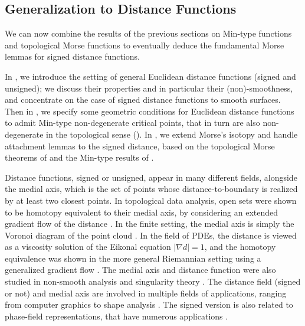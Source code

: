 \documentclass[11pt]{article}
\newcommand{\grad}{\nabla}
\theoremstyle{plain}
\theoremstyle{definition}
\theoremstyle{remark}
\begin{document}
\subsection{Generalization to Distance Functions}
\label{sec:generalization_dist_functions}

We can now combine the results of the previous sections on Min-type functions and topological Morse functions to eventually deduce the fundamental Morse lemmas for signed distance functions.

In , we introduce the setting of general Euclidean distance functions (signed and unsigned); we discuss their properties and in particular their (non)-smoothness, and concentrate on the case of signed distance functions to smooth surfaces.
Then in , we specify some geometric conditions for Euclidean distance functions to admit Min-type non-degenerate critical points, that in turn are also non-degenerate in the topological sense ().
In , we extend Morse's isotopy and handle attachment lemmas to the signed distance, based on the topological Morse theorems of  and the Min-type results of .

Distance functions, signed or unsigned, appear in many different fields, alongside the medial axis, which is the set of points whose distance-to-boundary is realized by at least two closest points. In topological data analysis, open sets were shown to be homotopy equivalent to their medial axis, by considering an extended gradient flow of the distance \citep{lieutier_any_2003, chazal_stability_2004}. In the finite setting, the medial axis is simply the Voronoi diagram of the point cloud \citep{lieutier_any_2003,attali_stability_2009}.
In the field of PDEs, the distance is viewed as a viscosity solution of the Eikonal equation $\vert \grad d \vert = 1$, and the homotopy equivalence was shown in the more general Riemannian setting using a generalized gradient flow \citep{albano_singular_2013}. The medial axis and distance function were also studied in non-smooth analysis and singularity theory \citep{cheeger_critical_1991,birbrair_medial_2017}.
The distance field (signed or not) and medial axis are involved in multiple fields of applications, ranging from computer graphics to shape analysis \citep{lee_medial_1982, lindquist_medial_1996, sigg_signed_2003, park_deepsdf_2019}. The signed version is also related to phase-field representations, that have numerous applications \citep{song_generation_2021}.
\end{document}
